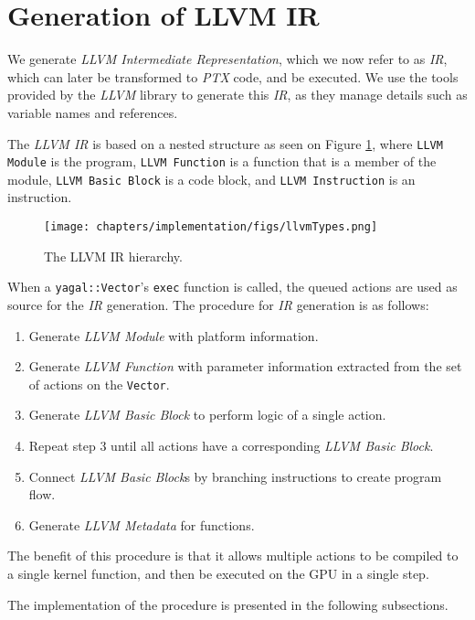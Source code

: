 \section{Generation of LLVM IR} \label{sec:actionToIr}
 We generate \textit{LLVM Intermediate Representation}, which we now refer to as \textit{IR}, which can later be transformed to \textit{PTX} code, and be executed. We use the tools provided by the \textit{LLVM} library to generate this \textit{IR}, as they manage details such as variable names and references.

The \textit{LLVM IR} is based on a nested structure as seen on Figure \ref{fig:llvmTypes}, where \texttt{LLVM Module} is the program, \texttt{LLVM Function} is a function that is a member of the module,  \texttt{LLVM Basic Block} is a code block, and \texttt{LLVM Instruction} is an instruction. 

\begin{figure}[!htb]
    \center
    \texttt{[image: chapters/implementation/figs/llvmTypes.png]}
    \caption{The LLVM IR hierarchy.}
    \label{fig:llvmTypes}
\end{figure}

When a \texttt{yagal::Vector}'s \texttt{exec} function is called, the queued actions are used as source for the \textit{IR} generation. The procedure for \textit{IR} generation is as follows:

\begin{enumerate}
\item Generate \textit{LLVM Module} with platform information.
\item Generate \textit{LLVM Function} with parameter information extracted from the set of actions on the \texttt{Vector}.
\item Generate \textit{LLVM Basic Block} to perform logic of a single action.
\item Repeat step 3 until all actions have a corresponding \textit{LLVM Basic Block}.
\item Connect \textit{LLVM Basic Block}s by branching instructions to create program flow.
\item Generate \textit{LLVM Metadata} for functions.
\end{enumerate}

The benefit of this procedure is that it allows multiple actions to be compiled to a single kernel function, and then be executed on the GPU in a single step.

The implementation of the procedure is presented in the following subsections.

